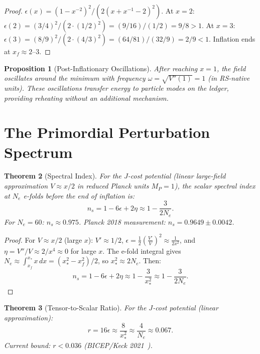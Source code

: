 \documentclass[12pt,a4paper]{article}
\newtheorem{theorem}{Theorem}[section]
\newtheorem{proposition}[theorem]{Proposition}
\theoremstyle{definition}
\theoremstyle{remark}
\begin{document}
\begin{proof}
$\epsilon(x) = (1-x^{-2})^2 / (2(x + x^{-1} - 2)^2)$.
At $x = 2$: $\epsilon(2) = (3/4)^2/(2 \cdot (1/2)^2)
= (9/16)/(1/2) = 9/8 > 1$.
At $x = 3$: $\epsilon(3) = (8/9)^2/(2 \cdot (4/3)^2)
= (64/81)/(32/9) = 2/9 < 1$.
Inflation ends at $x_f \approx 2$--$3$.
\end{proof}

\begin{proposition}[Post-Inflationary Oscillations]
\label{prop:oscillations}
After reaching $x = 1$, the field oscillates around the
minimum with frequency $\omega = \sqrt{V''(1)} = 1$
(in RS-native units).  These oscillations transfer
energy to particle modes on the ledger, providing
reheating without an additional mechanism.
\end{proposition}

\section{The Primordial Perturbation Spectrum}
\label{sec:spectrum}

\begin{theorem}[Spectral Index]
\label{thm:ns}
For the $J$-cost potential (linear large-field approximation
$V \approx x/2$ in reduced Planck units $M_P = 1$), the
scalar spectral index at $N_e$ e-folds before the end of
inflation is:
\begin{equation}
  \boxed{n_s = 1 - 6\epsilon + 2\eta
  \approx 1 - \frac{3}{2N_e}.}
  \label{eq:ns}
\end{equation}
For $N_e = 60$: $n_s \approx 0.975$.
Planck 2018 measurement: $n_s = 0.9649 \pm 0.0042$.
\end{theorem}

\begin{proof}
For $V \approx x/2$ (large $x$): $V' \approx 1/2$,
$\epsilon = \frac{1}{2}\left(\frac{V'}{V}\right)^2
\approx \frac{1}{2x^2}$, and $\eta = V''/V \approx 2/x^4
\approx 0$ for large $x$.
The e-fold integral gives $N_e \approx \int_{x_f}^{x_*} x\,dx
= (x_*^2 - x_f^2)/2$, so $x_*^2 \approx 2N_e$.  Then:
\begin{equation}
  n_s = 1 - 6\epsilon + 2\eta
  \approx 1 - \frac{3}{x_*^2}
  \approx 1 - \frac{3}{2N_e}.
\end{equation}
\end{proof}

\begin{theorem}[Tensor-to-Scalar Ratio]
\label{thm:r}
For the $J$-cost potential (linear approximation):
\begin{equation}
  \boxed{r = 16\epsilon \approx \frac{8}{x_*^2}
  \approx \frac{4}{N_e} \approx 0.067.}
  \label{eq:r}
\end{equation}
Current bound: $r < 0.036$ (BICEP/Keck
2021~\cite{BICEP}).
\end{theorem}
\end{document}
